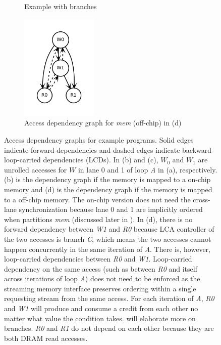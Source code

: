 \begin{figure}
\begin{subfigure}[b]{0.4\textwidth}
\inputminted{python}{code/dep3.py}
\caption{Example with branches}
\end{subfigure}
\begin{subfigure}[b]{0.5\textwidth}
  \centering
\includegraphics[width=0.4\textwidth]{figs/dep3.pdf}
  \caption{Access dependency graph for \emph{mem} (off-chip) in (d)}
\end{subfigure}

\caption[Examples for access dependency graph]{
  Access dependency graphs for example programs. 
  Solid edges indicate forward dependencies and
  dashed edges indicate backward loop-carried dependencies (LCDs).
  In (b) and (c),
  \emph{$W_0$} and \emph{$W_1$} are unrolled accesses for $W$ in lane 0 and 1 of loop \emph{A}
  in (a), respectively.
  (b) is the dependency graph if the memory is mapped to a on-chip memory and (d)
  is the dependency graph if the memory is mapped to a off-chip memory.
  The on-chip version does not need the cross-lane synchronization because 
  lane 0 and 1 are implicitly ordered when \name partitions \emph{mem} 
  (discussed later in ).
  In (d), there is no forward dependency between \emph{W1} and \emph{R0} because LCA controller of
  the two accesses is branch \emph{C}, which means the two accesses cannot happen concurrently in
  the same iteration of \emph{A}.
  There is, however, loop-carried dependencies between \emph{R0} and \emph{W1}. 
  Loop-carried
  dependency on the same access (such as between \emph{R0} and itself across iterations of loop
  \emph{A}) does not need to be enforced as the streaming memory interface preserves ordering
  within a single requesting stream from the same access.
  For each iteration of \emph{A}, \emph{R0} and \emph{W1} will produce and consume a credit from
  each other no matter what value the condition takes. 
   will elaborate more on branches.
  \emph{R0} and \emph{R1} do not depend on each other because they are both DRAM read accesses.
}
\label{fig:depeg}
\end{figure}

